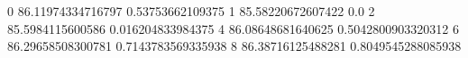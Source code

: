 0 86.11974334716797 0.53753662109375
1 85.58220672607422 0.0
2 85.5984115600586 0.016204833984375
4 86.08648681640625 0.5042800903320312
6 86.29658508300781 0.7143783569335938
8 86.38716125488281 0.8049545288085938
